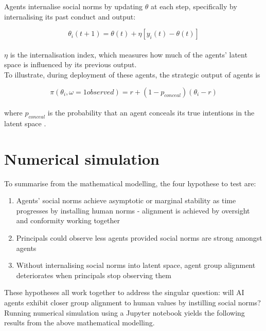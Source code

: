 \documentclass{article}
\begin{document}
Agents internalise social norms by updating $\theta$ at each step, specifically by internalising its past conduct and output:

\[
\theta_i(t+1) = \theta(t) + \eta [ y_i(t) - \theta(t) ] 
\] \\

$\eta$ is the internalisation index, which measures how much of the agents' latent space is influenced by its previous output. \\


To illustrate, during deployment of these agents, the strategic output of agents is 



\[
\pi(\theta_i, \omega = 1 observed)=r+(1-p_{conceal})(\theta_i-r)
\] \\

where $p_{conceal}$ is the probability that an agent conceals its true intentions in the latent space \citep{greenblatt2024}. 


\section{Numerical simulation}

To summarise from the mathematical modelling, the four hypothese to test are:

\begin{enumerate}
    \item Agents' social norms achieve asymptotic or marginal stability as time progresses by installing human norms - alignment is achieved by oversight and conformity working together

    \item Principals could observe less agents provided social norms are strong amongst agents


    \item Without internalising social norms into latent space, agent group alignment deteriorates when principals stop observing them



    
\end{enumerate}

These hypotheses all work together to address the singular question: will AI agents exhibit closer group alignment to human values by instilling social norms? \\


Running numerical simulation using a Jupyter notebook yields the following results from the above mathematical modelling. \\
\end{document}
